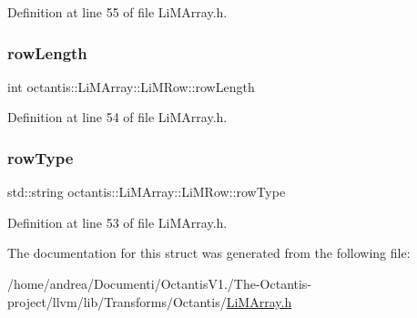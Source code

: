 Definition at line 55 of file Li\+M\+Array.\+h.

\mbox{\label{structoctantis_1_1LiMArray_1_1LiMRow_ac8d2c9fe6d1958d880fa4c55c57b8b29}} 
\subsubsection{\texorpdfstring{row\+Length}{rowLength}}
{\footnotesize\ttfamily int octantis\+::\+Li\+M\+Array\+::\+Li\+M\+Row\+::row\+Length}



Definition at line 54 of file Li\+M\+Array.\+h.

\mbox{\label{structoctantis_1_1LiMArray_1_1LiMRow_aa35d698f2e26f6e0e66026fd2e8686a1}} 
\subsubsection{\texorpdfstring{row\+Type}{rowType}}
{\footnotesize\ttfamily std\+::string octantis\+::\+Li\+M\+Array\+::\+Li\+M\+Row\+::row\+Type}



Definition at line 53 of file Li\+M\+Array.\+h.



The documentation for this struct was generated from the following file\+:\begin{DoxyCompactItemize}
\item 
/home/andrea/\+Documenti/\+Octantis\+V1./\+The-\/\+Octantis-\/project/llvm/lib/\+Transforms/\+Octantis/\hyperlink{LiMArray_8h}{Li\+M\+Array.\+h}\end{DoxyCompactItemize}
